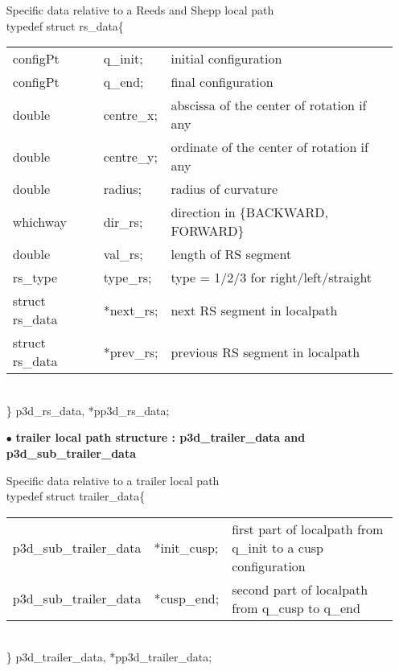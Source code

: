\begin{itemize}
Specific data relative to a Reeds and Shepp local path\\
typedef struct rs\_data\{\\
\begin{tabular}{lll}
  configPt &q\_init;    &initial configuration \\
  configPt &q\_end;       &final configuration  \\
  double &centre\_x;      &abscissa of the center of rotation if any \\
  double &centre\_y;       &ordinate of the center of rotation if any \\
  double &radius;          &radius of curvature \\
  whichway &dir\_rs;        &direction in \{BACKWARD, FORWARD\} \\
  double &val\_rs;          &length of RS segment \\
  rs\_type &type\_rs;        &type = 1/2/3 for right/left/straight \\
  struct rs\_data &*next\_rs;  &next RS segment in localpath \\ 
  struct rs\_data &*prev\_rs;  &previous RS segment in localpath \\ 
\end{tabular}\\
\} p3d\_rs\_data, *pp3d\_rs\_data;


\item[$\bullet$]{\bf trailer local path structure : p3d\_trailer\_data
    and  p3d\_sub\_trailer\_data}\\

Specific data relative to a trailer local path\\
typedef struct trailer\_data\{\\
\begin{tabular}{lll}
  p3d\_sub\_trailer\_data &*init\_cusp; & first part of localpath from
  q\_init to a cusp configuration \\
  p3d\_sub\_trailer\_data &*cusp\_end; &second part of localpath from
  q\_cusp to q\_end\\
\end{tabular}\\
\} p3d\_trailer\_data, *pp3d\_trailer\_data;\\



\end{itemize}
